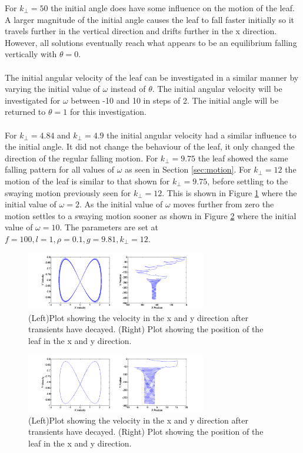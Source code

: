 For $k_{\perp}=50$ the initial angle does have some influence on the motion of the leaf. A larger magnitude of the initial angle causes the leaf to fall faster initially so it travels further in the vertical direction and drifts further in the x direction. However, all solutions eventually reach what appears to be an equilibrium falling vertically with $\theta=0$. 
\\
\\
The initial angular velocity of the leaf can be investigated in a similar manner by varying the initial value of $\omega$ instead of $\theta$. The initial angular velocity will be investigated for $\omega$ between -10 and 10 in steps of 2. The initial angle will be returned to $\theta=1$ for this investigation. 
\\
\\
For $k_{\perp}=4.84$ and $k_{\perp}=4.9$  the initial angular velocity had a similar influence to the initial angle. It did not change the behaviour of the leaf, it only changed the direction of the regular falling motion. For $k_{\perp}=9.75$ the leaf showed the same falling pattern for all values of $\omega$ as seen in Section \ref{sec:motion}. For $k_{\perp}=12$ the motion of the leaf is similar to that shown for $k_{\perp}=9.75$, before settling to the swaying motion previously seen for $k_{\perp}=12$. This is shown in Figure \ref{fig:kper12Omega0_2} where the initial value of $\omega=2$. As the initial value of $\omega$ moves further from zero the motion settles to a swaying motion sooner as shown in Figure \ref{fig:kper12Omega0_10} where the initial value of $\omega=10$. The parameters are set at $f=100, l=1, \rho = 0.1, g = 9.81, k_{\perp} = 12$. 

\begin{figure}[H]
\centering
\includegraphics[width=0.7\textwidth]{IO_2_kper_12.png}
\caption{\label{fig:kper12Omega0_2}(Left)Plot showing the velocity in the x and y direction after transients have decayed. (Right) Plot showing the position of the leaf in the x and y direction.
}
\end{figure}

\begin{figure}[H]
\centering
\includegraphics[width=0.7\textwidth]{IO_10_kper_12.png}
\caption{\label{fig:kper12Omega0_10}(Left)Plot showing the velocity in the x and y direction after transients have decayed. (Right) Plot showing the position of the leaf in the x and y direction.
}
\end{figure}

